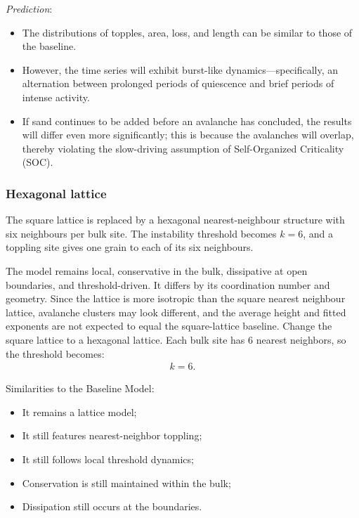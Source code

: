 \documentclass{article}
\begin{document}
\textit{Prediction}:

\begin{itemize}
    \item The distributions of topples, area, loss, and length can be similar to those of the baseline.
    \item However, the time series will exhibit burst-like dynamics—specifically, an alternation between prolonged periods of quiescence and brief periods of intense activity.
    \item If sand continues to be added before an avalanche has concluded, the results will differ even more significantly; this is because the avalanches will overlap, thereby violating the slow-driving assumption of Self-Organized Criticality (SOC).
\end{itemize}

\clearpage

\subsubsection{Hexagonal lattice}
The square lattice is replaced by a hexagonal nearest-neighbour structure with six neighbours per bulk site. The instability threshold becomes $k=6$, and a toppling site gives one grain to each of its six neighbours.

The model remains local, conservative in the bulk, dissipative at open boundaries, and threshold-driven. It differs by its coordination number and geometry. Since the lattice is more isotropic than the square nearest neighbour lattice, avalanche clusters may look different, and the average height and fitted exponents are not expected to equal the square-lattice baseline. Change the square lattice to a hexagonal lattice. Each bulk site has $6$ nearest neighbors, so the threshold becomes:
\begin{align}
    k=6.
\end{align}

Similarities to the Baseline Model:
\begin{itemize}
    \item It remains a lattice model;
    \item It still features nearest-neighbor toppling;
    \item It still follows local threshold dynamics;
    \item Conservation is still maintained within the bulk;
    \item Dissipation still occurs at the boundaries.
\end{itemize}
\end{document}
